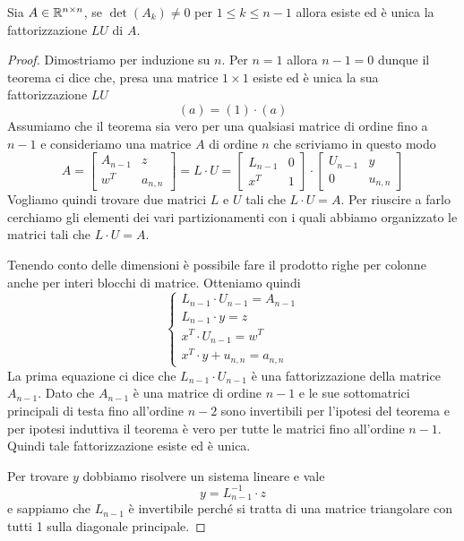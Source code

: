 \begin{theorem}
	Sia $A \in \mathbb{R}^{n \times n}$, se $\det(A_k) \neq 0$ per $1 \leq k \leq n-1$ allora esiste ed è unica la
	fattorizzazione $LU$ di $A$.
	\begin{proof}
		Dimostriamo per induzione su $n$. Per $n = 1$ allora $n-1 = 0$ dunque il teorema ci dice che, presa
		una matrice $1 \times 1$ esiste ed è unica la sua fattorizzazione $LU$
		\[ (a) = (1) \cdot (a) \]
		Assumiamo che il teorema sia vero per una qualsiasi matrice di ordine fino a $n-1$ e consideriamo una
		matrice $A$ di ordine $n$ che scriviamo in questo modo
		\[
			A = \begin{bmatrix}
				A_{n-1} & z       \\
				w^T     & a_{n,n}
			\end{bmatrix} = L \cdot U =
			\begin{bmatrix}
				L_{n-1} & 0 \\
				x^T     & 1
			\end{bmatrix} \cdot
			\begin{bmatrix}
				U_{n-1} & y       \\
				0       & u_{n,n}
			\end{bmatrix}
		\]
		Vogliamo quindi trovare due matrici $L$ e $U$ tali che $L \cdot U = A$. Per riuscire a farlo cerchiamo
		gli elementi dei vari partizionamenti con i quali abbiamo organizzato le matrici tali che $L \cdot U = A$.

		Tenendo conto delle dimensioni è possibile fare il prodotto righe per colonne anche per interi blocchi di
		matrice. Otteniamo quindi
		\[
			\begin{cases}
				L_{n-1} \cdot U_{n-1} = A_{n-1} \\
				L_{n-1} \cdot y = z             \\
				x^T \cdot U_{n-1} = w^T         \\
				x^T \cdot y + u_{n,n} = a_{n,n}
			\end{cases}
		\]
		La prima equazione ci dice che $L_{n-1} \cdot U_{n-1}$ è una fattorizzazione della matrice $A_{n-1}$.
		Dato che $A_{n-1}$ è una matrice di ordine $n-1$ e le sue sottomatrici principali di testa fino all'ordine
		$n-2$ sono invertibili per l'ipotesi del teorema e per ipotesi induttiva il teorema è vero per tutte le
		matrici fino all'ordine $n-1$. Quindi tale fattorizzazione esiste ed è unica.

		Per trovare $y$ dobbiamo risolvere un sistema lineare e vale
		\[ y = L_{n-1}^{-1} \cdot z \]
		e sappiamo che $L_{n-1}$ è invertibile perché si tratta di una matrice triangolare con tutti 1 sulla
		diagonale principale.


\end{proof}
\end{theorem}
